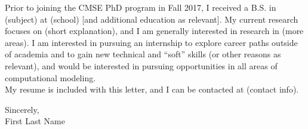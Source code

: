 Prior to joining the CMSE PhD program in Fall 2017, I received a B.S. in (subject) at (school) [and additional education as relevant].  My current research focuses on (short explanation), and I am generally interested in research in (more areas).  I am interested in pursuing an internship to explore career paths outside of academia and to gain new technical and “soft” skills (or other reasons as relevant), and would be interested in pursuing opportunities in all areas of computational modeling.\\

My resume is included with this letter, and I can be contacted at (contact info).\\

\begin{flushright}
Sincerely, \\
\vspace{1em} 
\vspace{1em} 
First Last Name\\
\end{flushright}
